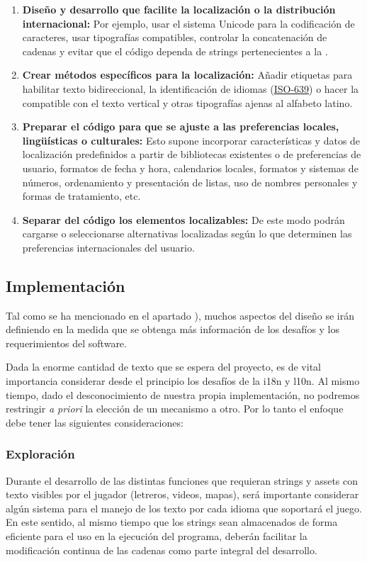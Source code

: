 \begin{enumerate}
	\item \textbf{Diseño y desarrollo que facilite la localización o la distribución internacional:}
	Por ejemplo, usar el sistema Unicode para la codificación de caracteres, usar tipografías compatibles, controlar la concatenación de cadenas y evitar que el código dependa de strings pertenecientes a la .
	
	\item \textbf{Crear métodos específicos para la localización:}
	Añadir etiquetas para habilitar texto bidireccional, la identificación de idiomas (\href{https://es.wikipedia.org/wiki/ISO_639}{ISO-639}) o hacer la  compatible con el texto vertical y otras tipografías ajenas al alfabeto latino.
	
	\item \textbf{Preparar el código para que se ajuste a las preferencias locales, lingüísticas o culturales:}
	Esto supone incorporar características y datos de localización predefinidos a partir de bibliotecas existentes o de preferencias de usuario, formatos de fecha y hora, calendarios locales, formatos y sistemas de números, ordenamiento y presentación de listas, uso de nombres personales y formas de tratamiento, etc.
	
	\item \textbf{Separar del código los elementos localizables:}
	De este modo podrán cargarse o seleccionarse alternativas localizadas según lo que determinen las preferencias internacionales del usuario.
\end{enumerate}

\subsection{Implementación}\label{i18n:implementacion}
Tal como se ha mencionado en el apartado ), muchos aspectos del diseño se irán definiendo en la medida que se obtenga más información de los desafíos y los requerimientos del software.

Dada la enorme cantidad de texto que se espera del proyecto, es de vital importancia considerar desde el principio los desafíos de la i18n y l10n.
Al mismo tiempo, dado el desconocimiento de nuestra propia implementación, no podremos restringir \textit{a priori} la elección de un mecanismo a otro. Por lo tanto el enfoque debe tener las siguientes consideraciones:

\subsubsection{Exploración}\label{i18n:exploracion}
Durante el desarrollo de las distintas funciones que requieran strings y assets con texto visibles por el jugador (letreros, videos, mapas), será importante considerar algún sistema para el manejo de los texto por cada idioma que soportará el juego.
En este sentido, al mismo tiempo que los strings sean almacenados de forma eficiente para el uso en la ejecución del programa, deberán facilitar la modificación continua de las cadenas como parte integral del desarrollo.

